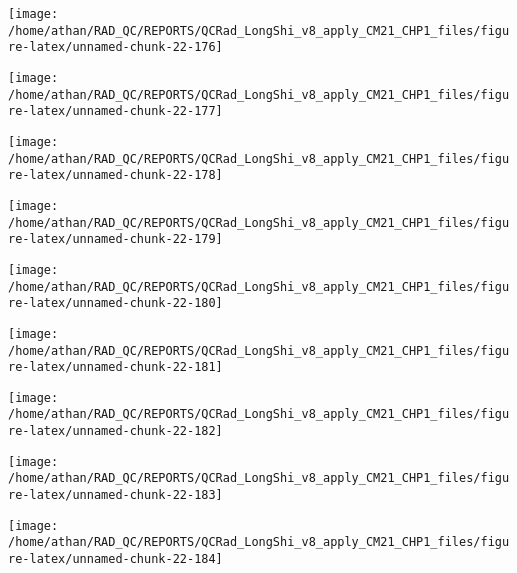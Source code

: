 \documentclass[
  10pt,
  a4paper,oneside]{article}
\begin{document}
\begin{center}\texttt{[image: /home/athan/RAD\_QC/REPORTS/QCRad\_LongShi\_v8\_apply\_CM21\_CHP1\_files/figure-latex/unnamed-chunk-22-176]} \end{center}

\begin{center}\texttt{[image: /home/athan/RAD\_QC/REPORTS/QCRad\_LongShi\_v8\_apply\_CM21\_CHP1\_files/figure-latex/unnamed-chunk-22-177]} \end{center}

\begin{center}\texttt{[image: /home/athan/RAD\_QC/REPORTS/QCRad\_LongShi\_v8\_apply\_CM21\_CHP1\_files/figure-latex/unnamed-chunk-22-178]} \end{center}

\begin{center}\texttt{[image: /home/athan/RAD\_QC/REPORTS/QCRad\_LongShi\_v8\_apply\_CM21\_CHP1\_files/figure-latex/unnamed-chunk-22-179]} \end{center}

\begin{center}\texttt{[image: /home/athan/RAD\_QC/REPORTS/QCRad\_LongShi\_v8\_apply\_CM21\_CHP1\_files/figure-latex/unnamed-chunk-22-180]} \end{center}

\begin{center}\texttt{[image: /home/athan/RAD\_QC/REPORTS/QCRad\_LongShi\_v8\_apply\_CM21\_CHP1\_files/figure-latex/unnamed-chunk-22-181]} \end{center}

\begin{center}\texttt{[image: /home/athan/RAD\_QC/REPORTS/QCRad\_LongShi\_v8\_apply\_CM21\_CHP1\_files/figure-latex/unnamed-chunk-22-182]} \end{center}

\begin{center}\texttt{[image: /home/athan/RAD\_QC/REPORTS/QCRad\_LongShi\_v8\_apply\_CM21\_CHP1\_files/figure-latex/unnamed-chunk-22-183]} \end{center}

\begin{center}\texttt{[image: /home/athan/RAD\_QC/REPORTS/QCRad\_LongShi\_v8\_apply\_CM21\_CHP1\_files/figure-latex/unnamed-chunk-22-184]} \end{center}
\end{document}
